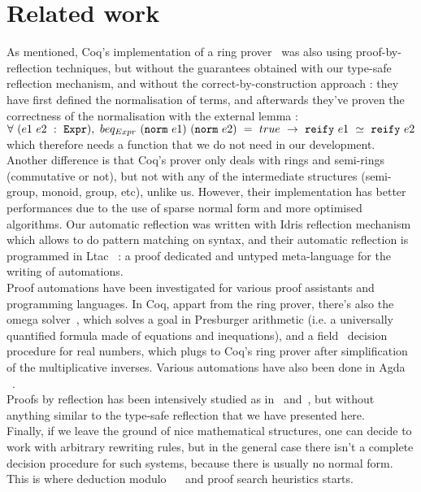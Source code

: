 \section{Related work}
\label{sect:relatedWork}

As mentioned, Coq's implementation of a ring prover~\cite{Coq2005} was also using proof-by-reflection techniques, but without the guarantees obtained with our type-safe reflection mechanism, and without the correct-by-construction approach : they have first defined the normalisation of terms, and afterwards they've proven the correctness of the normalisation with the external lemma :
$\forall\ (e1\ e2\ :\ \code{Expr}),\ beq_{Expr}\ (\code{norm}\ e1)\ (\code{norm}\ e2)\ =\ true\ \rightarrow\ \code{reify}\ e1\ \simeq\ \code{reify}\ e2$ which therefore needs a  function that we do not need in our development. Another difference is that Coq's prover only deals with rings and semi-rings (commutative or not), but not with any of the intermediate structures (semi-group, monoid, group, etc), unlike us. However, their implementation has better performances due to the use of sparse normal form and more optimised algorithms.
Our automatic reflection was written with Idris reflection mechanism which allows to do pattern matching on syntax, and their automatic reflection is programmed in Ltac~\cite{DelahayeLTac} : a proof dedicated and untyped meta-language for the writing of automations. \\

Proof automations have been investigated for various proof assistants and programming languages. In Coq, appart from the ring prover, there's also the omega solver~\cite{Cregut04}, which solves a goal in Presburger arithmetic (i.e. a universally quantified formula made of equations and inequations), and a field~\cite{DelahayeField} decision procedure for real numbers, which plugs to Coq's ring prover after simplification of the multiplicative inverses. Various automations have also been done in Agda~\cite{DBLP:conf/mpc/KokkeS15} ~\cite{Lindblad04}. \\

Proofs by reflection has been intensively studied as in~\cite{ChlipalaBook} and~\cite{Malecha14}, but without anything similar to the type-safe reflection that we have presented here. \\

Finally, if we leave the ground of nice mathematical structures, one can decide to work with arbitrary rewriting rules, but in the general case there isn't a complete decision procedure for such systems, because there is usually no normal form. This is where deduction modulo~\cite{Dowek03} ~\cite{DelahayeModulo} and proof search heuristics starts. \\


